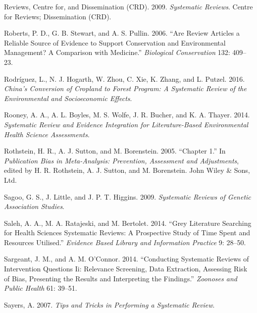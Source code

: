 \documentclass[
  letterpaper,
  DIV=11,
  numbers=noendperiod]{scrreprt}
\newlength{\cslhangindent}
\newenvironment{CSLReferences}[2] %
 {\begin{list}{}{%
  \setlength{\itemindent}{0pt}
  \setlength{\leftmargin}{0pt}
  \setlength{\parsep}{0pt}
  \ifodd #1
   \setlength{\leftmargin}{\cslhangindent}
   \setlength{\itemindent}{-1\cslhangindent}
  \fi
  \setlength{\itemsep}{#2\baselineskip}}}
 {\end{list}}
\begin{document}
\begin{CSLReferences}{1}{1}
Reviews, Centre for, and Dissemination (CRD). 2009. \emph{Systematic
Reviews}. Centre for Reviews; Dissemination (CRD).

Roberts, P. D., G. B. Stewart, and A. S. Pullin. 2006. {``Are Review
Articles a Reliable Source of Evidence to Support Conservation and
Environmental Management? A Comparison with Medicine.''}
\emph{Biological Conservation} 132: 409--23.

Rodríguez, L., N. J. Hogarth, W. Zhou, C. Xie, K. Zhang, and L. Putzel.
2016. \emph{China's Conversion of Cropland to Forest Program: A
Systematic Review of the Environmental and Socioeconomic Effects}.

Rooney, A. A., A. L. Boyles, M. S. Wolfe, J. R. Bucher, and K. A.
Thayer. 2014. \emph{Systematic Review and Evidence Integration for
Literature-Based Environmental Health Science Assessments}.

Rothstein, H. R., A. J. Sutton, and M. Borenstein. 2005. {``Chapter
1.''} In \emph{Publication Bias in Meta-Analysis: Prevention, Assessment
and Adjustments}, edited by H. R. Rothstein, A. J. Sutton, and M.
Borenstein. John Wiley \& Sons, Ltd.

Sagoo, G. S., J. Little, and J. P. T. Higgins. 2009. \emph{Systematic
Reviews of Genetic Association Studies}.

Saleh, A. A., M. A. Ratajeski, and M. Bertolet. 2014. {``Grey Literature
Searching for Health Sciences Systematic Reviews: A Prospective Study of
Time Spent and Resources Utilised.''} \emph{Evidence Based Library and
Information Practice} 9: 28--50.

Sargeant, J. M., and A. M. O'Connor. 2014. {``Conducting Systematic
Reviews of Intervention Questions Ii: Relevance Screening, Data
Extraction, Assessing Risk of Bias, Presenting the Results and
Interpreting the Findings.''} \emph{Zoonoses and Public Health} 61:
39--51.

Sayers, A. 2007. \emph{Tips and Tricks in Performing a Systematic
Review}.


\end{CSLReferences}
\end{document}
